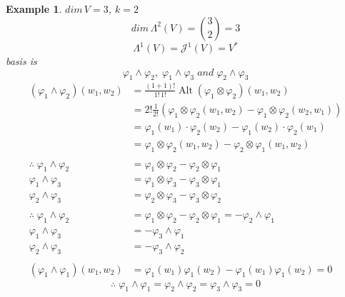 \documentclass[11pt]{article}
\def\maj{\mathcal{J}}
\DeclareMathOperator{\alt}{Alt}
\newtheorem{example}{Example}[section]
\begin{document}
\begin{example}
$dim\,V = 3$, $k=2$
\[dim\,\Lambda^2(V) = {3 \choose 2} = 3\]
\[\Lambda^1(V) = \maj^1(V) = V^{*}\]
basis is \[\varphi_1\wedge\varphi_2 ,\; \varphi_1\wedge\varphi_3 \; and \;\varphi_2\wedge\varphi_3\]
\begin{align*}
(\varphi_{1}\wedge\varphi_{2})(w_1,w_2)&= \frac{(1+1)!}{1!\,1!}\alt(\varphi_{1}\otimes\varphi_{2})(w_1,w_2)\\
&=2!\frac{1}{2!}(\varphi_{1}\otimes\varphi_{2}(w_1,w_2) -\varphi_{1}\otimes\varphi_{2}(w_2,w_1))\\
&=\varphi_1(w_1)\cdot\varphi_2(w_2) - \varphi_1(w_2)\cdot\varphi_2(w_1) \\
&=\varphi_{1}\otimes\varphi_{2}(w_1,w_2) - \varphi_{2}\otimes\varphi_{1}(w_1,w_2)\\
&\quad\\
\therefore \; \varphi_1\wedge\varphi_2 & = \varphi_{1}\otimes\varphi_{2} -\varphi_{2}\otimes\varphi_{1}\\
\varphi_1\wedge\varphi_3 & = \varphi_{1}\otimes\varphi_{3} -\varphi_{3}\otimes\varphi_{1}\\
\varphi_2\wedge\varphi_3 & = \varphi_{2}\otimes\varphi_{3} -\varphi_{3}\otimes\varphi_{2}\\
&\quad\\
\therefore \; \varphi_1\wedge\varphi_2 & = \varphi_{1}\otimes\varphi_{2} -\varphi_{2}\otimes\varphi_{1} = - \varphi_2\wedge\varphi_1\\
\varphi_1\wedge\varphi_3 &= -\varphi_3\wedge\varphi_1\\
\varphi_2\wedge\varphi_3 &= -\varphi_3\wedge\varphi_2\\
&\quad\\
(\varphi_1\wedge\varphi_1)(w_1, w_2) &= \varphi_1(w_1)\varphi_1(w_2) - \varphi_1(w_1)\varphi_1(w_2) =0
\end{align*}
\[\therefore \; \boxed{\varphi_1\wedge\varphi_1 = \varphi_2\wedge\varphi_2 = \varphi_3\wedge\varphi_3 = 0}\]
\end{example}
\end{document}
